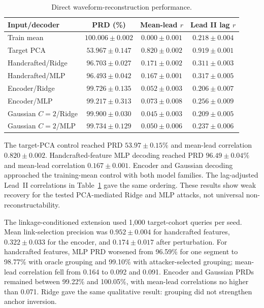\documentclass[journal]{IEEEtran}
\begin{document}
\begin{table}[ht]
\centering
\scriptsize
\setlength{\tabcolsep}{2pt}
\caption{Direct waveform-reconstruction performance.}
\label{tab:reconstruction-global}
\begin{tabular}{lccc}
\toprule
Input/decoder & PRD (\%) & Mean-lead $r$ & Lead II lag $r$ \\
\midrule
Train mean & $100.006\mathbin{\pm}0.002$ & $0.000\mathbin{\pm}0.001$ & $0.218\mathbin{\pm}0.004$ \\
Target PCA & $53.967\mathbin{\pm}0.147$ & $0.820\mathbin{\pm}0.002$ & $0.919\mathbin{\pm}0.001$ \\
Handcrafted/Ridge & $96.703\mathbin{\pm}0.027$ & $0.171\mathbin{\pm}0.002$ & $0.311\mathbin{\pm}0.003$ \\
Handcrafted/MLP & $96.493\mathbin{\pm}0.042$ & $0.167\mathbin{\pm}0.001$ & $0.317\mathbin{\pm}0.005$ \\
Encoder/Ridge & $99.726\mathbin{\pm}0.135$ & $0.052\mathbin{\pm}0.003$ & $0.206\mathbin{\pm}0.007$ \\
Encoder/MLP & $99.217\mathbin{\pm}0.313$ & $0.073\mathbin{\pm}0.008$ & $0.256\mathbin{\pm}0.009$ \\
Gaussian $C=2$/Ridge & $99.900\mathbin{\pm}0.030$ & $0.045\mathbin{\pm}0.003$ & $0.209\mathbin{\pm}0.005$ \\
Gaussian $C=2$/MLP & $99.734\mathbin{\pm}0.129$ & $0.050\mathbin{\pm}0.006$ & $0.237\mathbin{\pm}0.006$ \\
\bottomrule
\end{tabular}
\end{table}

The target-PCA control reached PRD $53.97\mathbin{\pm}0.15\%$ and mean-lead
correlation $0.820\mathbin{\pm}0.002$. Handcrafted-feature MLP decoding reached
PRD $96.49\mathbin{\pm}0.04\%$ and mean-lead correlation
$0.167\mathbin{\pm}0.001$. Encoder and Gaussian decoding approached the
training-mean control with both model families. The lag-adjusted Lead~II
correlations in Table~\ref{tab:reconstruction-global} gave the same ordering.
These results show weak recovery for the tested PCA-mediated Ridge and MLP
attacks, not universal non-reconstructability.

The linkage-conditioned extension used 1,000 target-cohort queries per seed.
Mean link-selection precision was $0.952\mathbin{\pm}0.004$ for handcrafted features,
$0.322\mathbin{\pm}0.033$ for the encoder, and
$0.174\mathbin{\pm}0.017$ after perturbation. For handcrafted features, MLP PRD
worsened from 96.59\% for one segment to 98.77\% with oracle grouping and
99.10\% with attacker-selected grouping; mean-lead correlation fell from 0.164
to 0.092 and 0.091. Encoder and Gaussian PRDs remained between 99.22\% and
100.05\%, with mean-lead correlations no higher than 0.071. Ridge gave the same
qualitative result: grouping did not strengthen anchor inversion.
\end{document}
